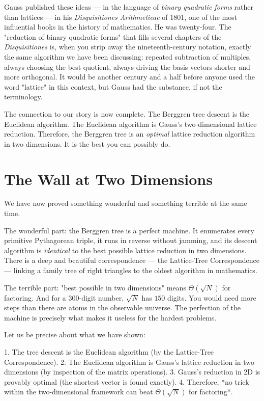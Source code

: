 Gauss published these ideas --- in the language of \textit{binary quadratic forms} rather than lattices --- in his \textit{Disquisitiones Arithmeticae} of 1801, one of the most influential books in the history of mathematics. He was twenty-four. The "reduction of binary quadratic forms" that fills several chapters of the \textit{Disquisitiones} is, when you strip away the nineteenth-century notation, exactly the same algorithm we have been discussing: repeated subtraction of multiples, always choosing the best quotient, always driving the basis vectors shorter and more orthogonal. It would be another century and a half before anyone used the word "lattice" in this context, but Gauss had the substance, if not the terminology.

The connection to our story is now complete. The Berggren tree descent is the Euclidean algorithm. The Euclidean algorithm is Gauss's two-dimensional lattice reduction. Therefore, the Berggren tree is an \textit{optimal} lattice reduction algorithm in two dimensions. It is the best you can possibly do.

\bigskip

\section*{The Wall at Two Dimensions}

We have now proved something wonderful and something terrible at the same time.

The wonderful part: the Berggren tree is a perfect machine. It enumerates every primitive Pythagorean triple, it runs in reverse without jamming, and its descent algorithm is \textit{identical} to the best possible lattice reduction in two dimensions. There is a deep and beautiful correspondence --- the Lattice-Tree Correspondence --- linking a family tree of right triangles to the oldest algorithm in mathematics.

The terrible part: "best possible in two dimensions" means $\Theta(\sqrt{N})$ for factoring. And for a $300$-digit number, $\sqrt{N}$ has $150$ digits. You would need more steps than there are atoms in the observable universe. The perfection of the machine is precisely what makes it useless for the hardest problems.

Let us be precise about what we have shown:

1. The tree descent is the Euclidean algorithm (by the Lattice-Tree Correspondence).
2. The Euclidean algorithm is Gauss's lattice reduction in two dimensions (by inspection of the matrix operations).
3. Gauss's reduction in 2D is provably optimal (the shortest vector is found exactly).
4. Therefore, *no trick within the two-dimensional framework can beat $\Theta(\sqrt{N})$ for factoring*.

